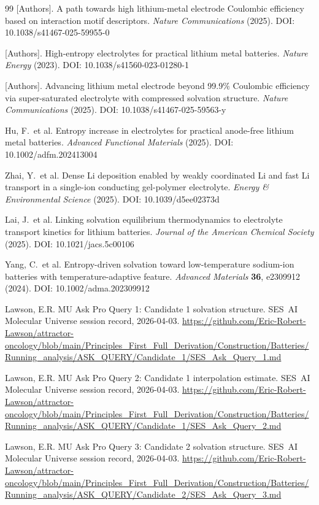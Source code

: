 \documentclass[12pt,letterpaper]{article}
\begin{document}
\begin{thebibliography}{99}
[Authors].
A path towards high lithium-metal electrode Coulombic
efficiency based on interaction motif descriptors.
\textit{Nature Communications} (2025).
DOI: 10.1038/s41467-025-59955-0

[Authors].
High-entropy electrolytes for practical lithium metal
batteries.
\textit{Nature Energy} (2023).
DOI: 10.1038/s41560-023-01280-1

[Authors].
Advancing lithium metal electrode beyond 99.9\%
Coulombic efficiency via super-saturated electrolyte
with compressed solvation structure.
\textit{Nature Communications} (2025).
DOI: 10.1038/s41467-025-59563-y

Hu, F.\ et al.
Entropy increase in electrolytes for practical
anode-free lithium metal batteries.
\textit{Advanced Functional Materials} (2025).
DOI: 10.1002/adfm.202413004

Zhai, Y.\ et al.
Dense Li deposition enabled by weakly coordinated Li
and fast Li transport in a single-ion conducting
gel-polymer electrolyte.
\textit{Energy \& Environmental Science} (2025).
DOI: 10.1039/d5ee02373d

Lai, J.\ et al.
Linking solvation equilibrium thermodynamics to
electrolyte transport kinetics for lithium batteries.
\textit{Journal of the American Chemical Society}
(2025).
DOI: 10.1021/jacs.5c00106

Yang, C.\ et al.
Entropy-driven solvation toward low-temperature
sodium-ion batteries with temperature-adaptive
feature.
\textit{Advanced Materials} \textbf{36},
e2309912 (2024).
DOI: 10.1002/adma.202309912

Lawson, E.R.
MU Ask Pro Query 1: Candidate 1 solvation structure.
SES~AI Molecular Universe session record,
2026-04-03.
\url{https://github.com/Eric-Robert-Lawson/attractor-oncology/blob/main/Principles_First_Full_Derivation/Construction/Batteries/Running_analysis/ASK_QUERY/Candidate_1/SES_Ask_Query_1.md}

Lawson, E.R.
MU Ask Pro Query 2: Candidate 1 interpolation
estimate.
SES~AI Molecular Universe session record,
2026-04-03.
\url{https://github.com/Eric-Robert-Lawson/attractor-oncology/blob/main/Principles_First_Full_Derivation/Construction/Batteries/Running_analysis/ASK_QUERY/Candidate_1/SES_Ask_Query_2.md}

Lawson, E.R.
MU Ask Pro Query 3: Candidate 2 solvation structure.
SES~AI Molecular Universe session record,
2026-04-03.
\url{https://github.com/Eric-Robert-Lawson/attractor-oncology/blob/main/Principles_First_Full_Derivation/Construction/Batteries/Running_analysis/ASK_QUERY/Candidate_2/SES_Ask_Query_3.md}


\end{thebibliography}
\end{document}

